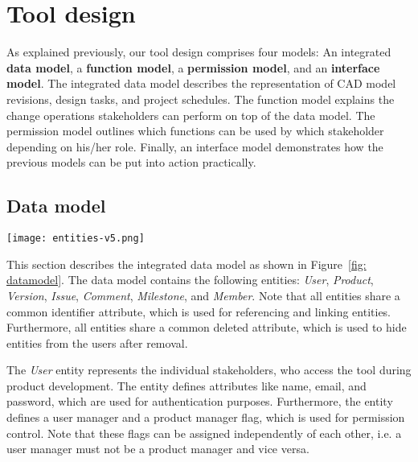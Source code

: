 \section{Tool design}
    \label{sec:contribution}

    As explained previously, our tool design comprises four models: An integrated \textbf{data model}, a \textbf{function model}, a \textbf{permission model}, and an \textbf{interface model}.
    The integrated data model describes the representation of CAD model revisions, design tasks, and project schedules.
    The function model explains the change operations stakeholders can perform on top of the data model.
    The permission model outlines which functions can be used by which stakeholder depending on his/her role.
    Finally, an interface model demonstrates how the previous models can be put into action practically.

    \subsection*{Data model}

    \begin{figure*}[ht]
        \centering
        \texttt{[image: entities-v5.png]}
        \caption{Integrated data model for improved information exchange between customers, project managers, requirements engineers, and product designers}
        \label{fig: datamodel}
    \end{figure*}

    This section describes the integrated data model as shown in Figure~\ref{fig: datamodel}.
    The data model contains the following entities: \textit{User}, \textit{Product}, \textit{Version}, \textit{Issue}, \textit{Comment}, \textit{Milestone}, and \textit{Member}.
    Note that all entities share a common identifier attribute, which is used for referencing and linking entities.
    Furthermore, all entities share a common deleted attribute, which is used to hide entities from the users after removal.

    The \textit{User} entity represents the individual stakeholders, who access the tool during product development.
    The entity defines attributes like name, email, and password, which are used for authentication purposes.
    Furthermore, the entity defines a user manager and a product manager flag, which is used for permission control.
    Note that these flags can be assigned independently of each other, i.e. a user manager must not be a product manager and vice versa.

